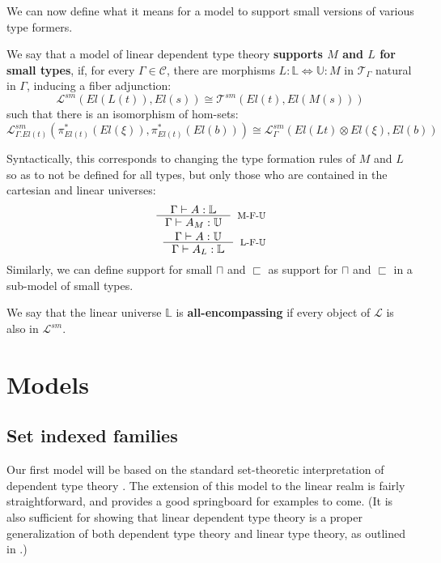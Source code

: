 \documentclass[a4paper,english]{lipics-v2018}
\begin{document}
We can now define what it means for a model to support small versions of various type formers. 
\begin{definition}
  We say that a model of linear dependent type theory \textbf{supports $M$ and $L$ for small types}, if, for every $\Gamma \in \mathcal{C}$, there are morphisms $L : \mathbb{L} \iff \mathbb{U} : M$ in $\mathcal{T}_\Gamma$ natural in $\Gamma$, inducing a fiber adjunction:
  \[
    \mathcal{L}^{sm}(El(L(t)), El(s)) \cong \mathcal{T}^{sm}(El(t), El(M(s)))
  \]
  such that there is an isomorphism of hom-sets:
  \[
    \mathcal{L}^{sm}_{\Gamma.El(t)}(\pi_{El(t)}^*(El(\xi)), \pi_{El(t)}^*(El(b))) \cong \mathcal{L}^{sm}_\Gamma(El(Lt) \otimes El(\xi), El(b))
  \]
\end{definition}
Syntactically, this corresponds to changing the type formation rules of $M$ and $L$ so as to not be defined for all types, but only those who are contained in the cartesian and linear universes:
\[
  \begin{split}
  \inference{\Gamma \vdash A : \mathbb{L}}
  {\Gamma \vdash A_M : \mathbb{U}}[M-F-$\mathbb{U}$]
  \\
  \inference{\Gamma \vdash A : \mathbb{U}}
  {\Gamma \vdash A_L : \mathbb{L}}[L-F-$\mathbb{U}$]
  \end{split}
\]
Similarly, we can define support for small $\sqcap$ and $\sqsubset$ as support for $\sqcap$ and $\sqsubset$ in a sub-model of small types.
\begin{definition}
  We say that the linear universe $\mathbb{L}$ is \textbf{all-encompassing} if every object of $\mathcal{L}$ is also in $\mathcal{L}^{sm}$.
\end{definition}
\newpage
\section{Models}\label{models}
\subsection{Set indexed families}
Our first model will be based on the standard set-theoretic interpretation of dependent type theory \cite{hofmann1997syntax}. The extension of this model to the linear realm is fairly straightforward, and provides a good springboard for examples to come. (It is also sufficient for showing that linear dependent type theory is a proper generalization of both dependent type theory and linear type theory, as outlined in \cite{vakar14}.)
\end{document}
